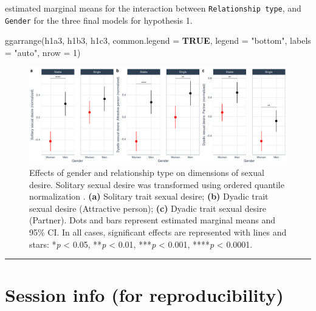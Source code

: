 \documentclass[
  bookmarksnumbered]{article}
\newenvironment{Shaded}{\begin{snugshade}}{\end{snugshade}}
\newcommand{\AttributeTok}[1]{\textcolor[rgb]{0.80,0.80,0.80}{#1}}
\newcommand{\ConstantTok}[1]{\textcolor[rgb]{0.86,0.64,0.64}{\textbf{#1}}}
\newcommand{\DecValTok}[1]{\textcolor[rgb]{0.86,0.86,0.80}{#1}}
\newcommand{\FunctionTok}[1]{\textcolor[rgb]{0.94,0.94,0.56}{#1}}
\newcommand{\NormalTok}[1]{\textcolor[rgb]{0.80,0.80,0.80}{#1}}
\newcommand{\StringTok}[1]{\textcolor[rgb]{0.80,0.58,0.58}{#1}}
\begin{document}
estimated marginal means for the interaction between \texttt{Relationship\ type}, and \texttt{Gender} for the three final models for hypothesis 1.

\begin{Shaded}
\begin{Highlighting}[]
\FunctionTok{ggarrange}\NormalTok{(h1a3, h1b3, h1c3,}
          \AttributeTok{common.legend =} \ConstantTok{TRUE}\NormalTok{,}
          \AttributeTok{legend =} \StringTok{"bottom"}\NormalTok{,}
          \AttributeTok{labels =} \StringTok{"auto"}\NormalTok{,}
          \AttributeTok{nrow =} \DecValTok{1}\NormalTok{)}
\end{Highlighting}
\end{Shaded}

\begin{figure}
\centering
\includegraphics{Sexual_Desire_Arousal_V2_files/figure-latex/fig-m1-fin-1.pdf}
\caption{\label{fig:fig-m1-fin}Effects of gender and relationship type on dimensions of sexual desire. Solitary sexual desire was transformed using ordered quantile normalization \autocite{petersonOrderedQuantileNormalization2020a}. \textbf{(a)} Solitary trait sexual desire; \textbf{(b)} Dyadic trait sexual desire (Attractive person); \textbf{(c)} Dyadic trait sexual desire (Partner). Dots and bars represent estimated marginal means and 95\% CI. In all cases, significant effects are represented with lines and stars: *\emph{p} \textless{} 0.05, **\emph{p} \textless{} 0.01, ***\emph{p} \textless{} 0.001, ****\emph{p} \textless{} 0.0001.}
\end{figure}

\begin{center}\rule{0.5\linewidth}{0.5pt}\end{center}

\section{Session info (for reproducibility)}\label{session}
\end{document}
